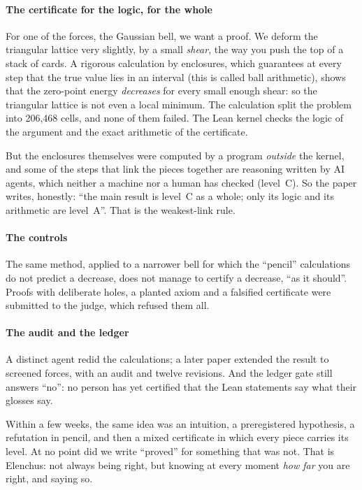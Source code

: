 \paragraph{The certificate  for the logic,  for the whole} For one of the forces, the Gaussian bell,
we want a proof. We deform the triangular lattice very slightly, by a small \emph{shear}, the way you push the top of
a stack of cards. A rigorous calculation by enclosures, which guarantees at every step that the true value lies in an
interval (this is called ball arithmetic), shows that the zero-point energy \emph{decreases} for every small enough
shear: so the triangular lattice is not even a local minimum. The calculation split the problem into 206,468 cells,
and none of them failed. The Lean kernel checks the logic of the argument and the exact arithmetic of the
certificate.

But the enclosures themselves were computed by a program \emph{outside} the kernel, and some of the steps that link
the pieces together are reasoning written by AI agents, which neither a machine nor a human has checked (level~C). So the paper writes, honestly: ``the main result is level~C as a whole;
only its logic and its arithmetic are level~A''. That is the weakest-link rule.

\paragraph{The controls} The same method, applied to a narrower bell for which the ``pencil'' calculations do not
predict a decrease, does not manage to certify a decrease, ``as it should''. Proofs with deliberate holes, a planted
axiom and a falsified certificate were submitted to the judge, which refused them all.

\paragraph{The audit and the ledger} A distinct agent redid the calculations; a later paper extended the result to
screened forces, with an audit and twelve revisions. And the ledger gate still answers ``no'': no person has yet certified that the Lean
statements say what their glosses say.

\begin{encadre}
Within a few weeks, the same idea was an intuition, a preregistered hypothesis, a refutation in pencil, and then a
mixed certificate in which every piece carries its level. At no point did we write ``proved'' for something that was
not. That is Elenchus: not always being right, but knowing at every moment \emph{how far} you are right, and saying
so.
\end{encadre}

